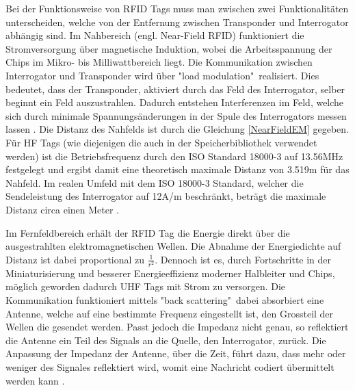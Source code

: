 Bei der Funktionsweise von \gls{RFID} Tags muss man zwischen zwei Funktionalitäten unterscheiden, welche von der Entfernung zwischen Transponder und Interrogator abhängig sind. Im Nahbereich (engl. Near-Field \gls{RFID}) funktioniert die Stromversorgung über magnetische Induktion, wobei die Arbeitsspannung der Chips im Mikro- bis Milliwattbereich liegt. Die Kommunikation zwischen Interrogator und Transponder wird über "load modulation"\ realisiert. Dies bedeutet, dass der Transponder, aktiviert durch das Feld des Interrogator, selber beginnt ein Feld auszustrahlen. Dadurch entstehen Interferenzen im Feld, welche sich durch minimale Spannungsänderungen in der Spule des Interrogators messen lassen \parencite{want2006}. Die Distanz des Nahfelds ist durch die Gleichung \ref{NearFieldEM} gegeben. Für \gls{HF} Tags (wie diejenigen die auch in der Speicherbibliothek verwendet werden) ist die Betriebsfrequenz durch den ISO Standard 18000-3 auf 13.56MHz festgelegt und ergibt damit eine theoretisch maximale Distanz von 3.519m für das Nahfeld. Im realen Umfeld mit dem ISO 18000-3 Standard, welcher die Sendeleistung des Interrogator auf 12A/m beschränkt, beträgt die maximale Distanz circa einen Meter \parencite{ISO18000-3}.


Im Fernfeldbereich erhält der \gls{RFID} Tag die Energie direkt über die ausgestrahlten elektromagnetischen Wellen. Die Abnahme der Energiedichte auf Distanz ist dabei proportional zu $\frac{1}{r^2}$. Dennoch ist es, durch Fortschritte in der Miniaturisierung und besserer Energieeffizienz moderner Halbleiter und Chips, möglich geworden dadurch \gls{UHF} Tags mit Strom zu versorgen. 
Die Kommunikation funktioniert mittels "back scattering"\, dabei absorbiert eine Antenne, welche auf eine bestimmte Frequenz eingestellt ist, den Grossteil der Wellen die gesendet werden. Passt jedoch die Impedanz nicht genau, so reflektiert die Antenne ein Teil des Signals an die Quelle, den Interrogator, zurück. Die Anpassung der Impedanz der Antenne, über die Zeit, führt dazu, dass mehr oder weniger des Signales reflektiert wird, womit eine Nachricht codiert übermittelt werden kann \parencite{want2006}.



